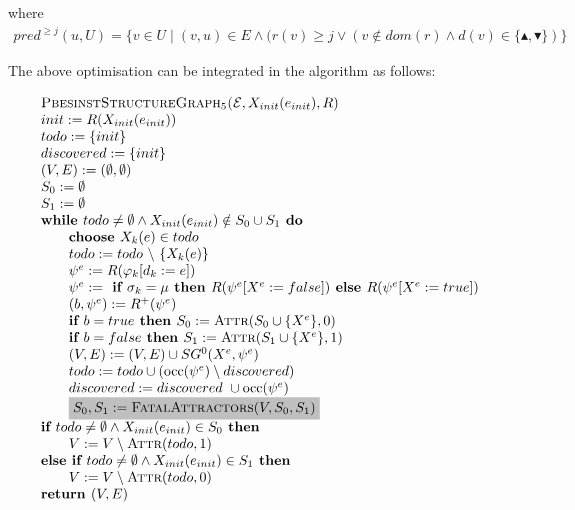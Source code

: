 \documentclass{article}
\newcommand{\Return}{\text{\textbf{return }}}
\begin{document}
where
\begin{eqnarray*}
pred^{\geq j}(u, U) = \{v \in U \mid (v,u) \in E \wedge (r(v) \ge j \vee (v \notin dom(r) \wedge d(v) \in \{\blacktriangle,\blacktriangledown\}) \}
\end{eqnarray*}%

The above optimisation can be integrated in the algorithm as follows:

\begin{equation*}
\begin{array}{l}
\textsc{PbesinstStructureGraph$_{5}$(}\mathcal{E}, X_{init}(e_{init}), R) \\ 
init:=R(X_{init}(e_{init})) \\
todo:=\{init\} \\
discovered:=\{init\} \\
(V,E) :=(\emptyset ,\emptyset ) \\ 
S_0:= \emptyset \\
S_1:= \emptyset \\
\textbf{while }todo \neq \emptyset \wedge X_{init}(e_{init}) \notin S_0 \cup S_1 \textbf{ do} \\ 
\qquad \text{\textbf{choose }}X_{k}(e)\in todo \\ 
\qquad todo:=todo\ \backslash \ \{X_{k}(e)\} \\ 
\qquad \psi ^{e}:=R(\varphi _{k}[d_{k}:=e]) \\ 
\qquad \psi^e := \textbf{ if } \sigma_k = \mu \textbf{ then } R(\psi^e[X^e := false])
\textbf{ else }  R(\psi^e[X^e := true]) \\
\qquad (b,\psi^e) := R^+(\psi^e) \\
\qquad \textbf{if $b = true$ then } S_0 := \textsc{Attr}(S_0 \cup \{ X^e \}, 0) \\
\qquad \textbf{if $b = false$ then } S_1 := \textsc{Attr}(S_1 \cup \{ X^e \}, 1) \\
\qquad (V,E) := (V,E) \cup SG^{0}(X^{e},\psi ^{e}) \\ 
\qquad todo:=todo\cup (\mathrm{occ}(\psi ^{e})\setminus discovered) \\
\qquad discovered:=discovered\ \cup \mathrm{occ}(\psi ^{e}) \\
\qquad \colorbox{lightgray}{$%
S_0, S_1 := \text{\textsc{FatalAttractors}}(V, S_0, S_1) $}\\  %
\textbf{if } todo \neq \emptyset \land X_{init}(e_{init}) \in S_0 \textbf{ then }\\
\qquad V := V \setminus \textsc{Attr}(todo, 1) \\
\textbf{else if } todo \neq \emptyset \land X_{init}(e_{init}) \in S_1 \textbf{ then }\\
\qquad V := V \setminus \textsc{Attr}(todo, 0) \\
\Return (V, E)
\end{array}%
\end{equation*}%
\end{document}

